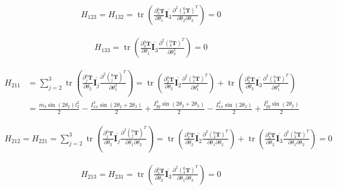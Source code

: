 \documentclass{homework}
\begin{document}
\begin{sol}
\begin{align*}
  H_{123} = H_{132} = \operatorname{tr} (\frac{\partial {^0_3}\mathbf{T}}{\partial \theta_1} \overline{\mathbf{I}_3} \frac{\partial^2 ({^0_3}\mathbf{T})^T}{\partial \theta_2 \partial \theta_3}) 
                    = 0
\end{align*}

\begin{align*}
  H_{133} = \operatorname{tr} (\frac{\partial {^0_3}\mathbf{T}}{\partial \theta_1} \overline{\mathbf{I}_3} \frac{\partial^2 ({^0_3}\mathbf{T})^T}{\partial \theta_3^2}) 
          = 0
\end{align*}

\begin{align*}
  H_{211} &= \sum_{j=2}^3 \operatorname{tr} (\frac{\partial {^0_j}\mathbf{T}}{\partial \theta_2} \overline{\mathbf{I}_j} \frac{\partial^2 ({^0_j}\mathbf{T})^T}{\partial \theta_1^2}) 
          = \operatorname{tr} (\frac{\partial {^0_2}\mathbf{T}}{\partial \theta_2} \overline{\mathbf{I}_2} \frac{\partial^2 ({^0_2}\mathbf{T})^T}{\partial \theta_1^2}) + \operatorname{tr} (\frac{\partial {^0_3}\mathbf{T}}{\partial \theta_2} \overline{\mathbf{I}_3} \frac{\partial^2 ({^0_3}\mathbf{T})^T}{\partial \theta_1^2}) \\
          &= \frac{m_3 \sin(2\theta_2) l_2^2}{2} - \frac{I_{xx}^3 \sin(2\theta_2 + 2\theta_3)}{2} + \frac{I_{yy}^3 \sin(2\theta_2 + 2\theta_3)}{2} - \frac{I_{xx}^2 \sin(2\theta_2)}{2} + \frac{I_{yy}^2 \sin(2\theta_2)}{2}
\end{align*}

\begin{align*}
  H_{212} = H_{221} = \sum_{j=2}^3 \operatorname{tr} (\frac{\partial {^0_j}\mathbf{T}}{\partial \theta_2} \overline{\mathbf{I}_j} \frac{\partial^2 ({^0_j}\mathbf{T})^T}{\partial \theta_1 \partial \theta_2}) 
                    = \operatorname{tr} (\frac{\partial {^0_2}\mathbf{T}}{\partial \theta_2} \overline{\mathbf{I}_2} \frac{\partial^2 ({^0_2}\mathbf{T})^T}{\partial \theta_1 \partial \theta_2}) + \operatorname{tr} (\frac{\partial {^0_3}\mathbf{T}}{\partial \theta_2} \overline{\mathbf{I}_3} \frac{\partial^2 ({^0_3}\mathbf{T})^T}{\partial \theta_1 \partial \theta_2})
                    = 0
\end{align*}

\begin{align*}
  H_{213} = H_{231} = \operatorname{tr} (\frac{\partial {^0_3}\mathbf{T}}{\partial \theta_2} \overline{\mathbf{I}_3} \frac{\partial^2 ({^0_3}\mathbf{T})^T}{\partial \theta_1 \partial \theta_3}) 
                    = 0
\end{align*}


\end{sol}
\end{document}
